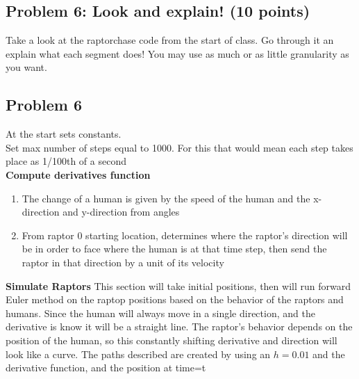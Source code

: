 \documentclass[]{article}
\begin{document}
\subsection{Problem 6: Look and explain! (10
points)}\label{problem-6-look-and-explain-10-points}

Take a look at the raptorchase code from the start of class. Go through
it an explain what each segment does! You may use as much or as little
granularity as you want.

\subsection{Problem 6}
At the start sets constants.  \\
Set max number of steps equal to 1000. For this that would mean each step takes place as 1/100th of a second \\
\textbf{Compute derivatives function }
\begin{enumerate}
\item 
The change of a human is given by the speed of the human and the x-direction and y-direction from angles
\item
From raptor 0 starting location, determines where the raptor's direction will be in order to face where the human is at that time step, then send the raptor in that direction by a unit of its velocity
\end{enumerate}
\textbf{Simulate Raptors}
This section will take initial positions, then will run forward Euler method on the raptop positions based on the behavior of the raptors and humans. Since the human will always move in a single direction, and the derivative is know it will be a straight line. The raptor's behavior depends on the position of the human, so this constantly shifting derivative and direction will look like a curve. The paths described are created by using an $h=0.01$ and the derivative function, and the position at time=t
\end{document}
